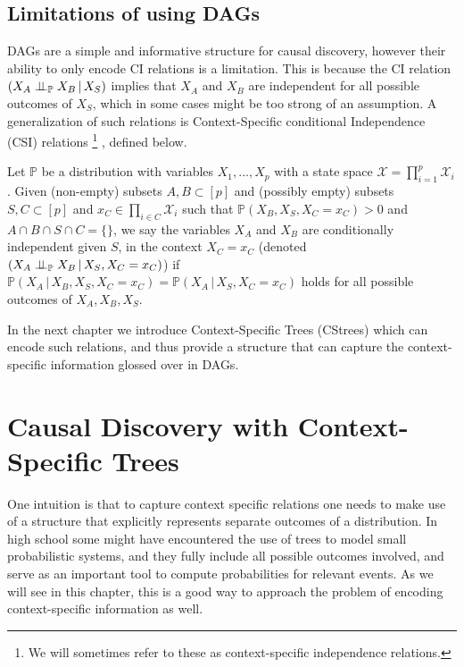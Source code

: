 \documentclass{tufte-book}
\begin{document}
\section{Limitations of using DAGs}
\label{sec:org992969f}
DAGs are a simple and informative structure for causal discovery, however their ability to only encode CI relations is a limitation. This is because the CI relation  \((X_A \perp \!\!\! \perp_{\mathbb{P}} X_B \,|\, X_S)\) implies that \(X_A\) and \(X_B\) are independent for all possible outcomes of \(X_S\), which in some cases might be too strong of an assumption. A generalization of such relations is Context-Specific conditional Independence (CSI) relations  \footnote{We will sometimes refer to these as context-specific independence relations.} , defined below.
\begin{definition}\label{def:csirel}
Let  $\mathbb{P}$ be a distribution with variables $X_1,...,X_p$ with a state space $\mathcal{X} = \prod_{i=1}^p \mathcal{X}_i$. Given (non-empty) subsets $A,B \subset [p]$ and (possibly empty) subsets $S,C \subset [p]$ and $x_C \in \prod_{i \in C}\mathcal{X}_i $ such that $\mathbb{P}(X_B, X_S, X_C = x_C)>0$ and $A \cap B \cap S \cap C = \{\}$, we say the variables $X_A$ and $X_B$ are conditionally independent given $S$, in the context $X_C=x_C$ (denoted $(X_A\perp \!\!\! \perp_{\mathbb{P}} X_B \,|\, X_S, X_C=x_C)$) if $\mathbb{P}(X_A \,|\,X_B, X_S,X_C=x_C) = \mathbb{P}(X_A \, |\, X_S,X_C=x_C)$ holds for all possible outcomes of $X_A,X_B,X_S$.
\end{definition}


In the next chapter we introduce Context-Specific Trees (CStrees) which can encode such relations, and thus provide a structure that can capture the context-specific information glossed over in DAGs.


 \newpage 

\chapter{Causal Discovery with Context-Specific Trees}
\label{sec:org229d7dd}
One intuition is that to capture context specific relations one needs to make use of a structure that explicitly represents separate outcomes of a distribution. In high school some might have encountered the use of trees to model small probabilistic systems, and they fully include all possible outcomes involved, and serve as an important tool to compute probabilities for relevant events. As we will see in this chapter, this is a good way to approach the problem of encoding context-specific information as well.
\end{document}
